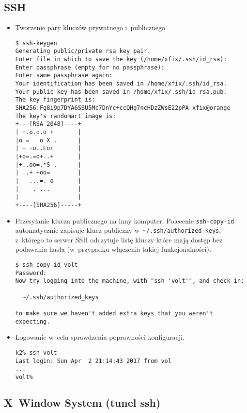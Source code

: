 \documentclass[a4paper,11pt]{article}
\begin{document}
\subsection{SSH}

\begin{itemize}

\item Tworzenie pary kluczów prywatnego i~publicznego

\begin{verbatim}
$ ssh-keygen 
Generating public/private rsa key pair.
Enter file in which to save the key (/home/xfix/.ssh/id_rsa): 
Enter passphrase (empty for no passphrase): 
Enter same passphrase again: 
Your identification has been saved in /home/xfix/.ssh/id_rsa.
Your public key has been saved in /home/xfix/.ssh/id_rsa.pub.
The key fingerprint is:
SHA256:Fg8i9p7DYA6SSU5Mc7DnYc+ccQHg7ncHDzZWsE22pPA xfix@orange
The key's randomart image is:
+---[RSA 2048]----+
| +.o.o.o +       |
|o =   o X .      |
| = =o..Eo+       |
|+o=.=o+..+       |
|+..oo=.*S .      |
| ..+ +oo=        |
|   ...=. o       |
|    . ...        |
|                 |
+----[SHA256]-----+
\end{verbatim}

\item Przesyłanie klucza publicznego na inny komputer. Polecenie
\verb|ssh-copy-id| automatycznie zapisuje klucz publiczny
w~\verb|~/.ssh/authorized_keys|, z~którego to serwer SSH odczytuje
listę kluczy które mają dostęp bez podawania hasła (w~przypadku
włączenia takiej funkcjonalności).

\begin{verbatim}
$ ssh-copy-id volt
Password: 
Now try logging into the machine, with "ssh 'volt'", and check in:

  ~/.ssh/authorized_keys

to make sure we haven't added extra keys that you weren't expecting.
\end{verbatim}

\item Logowanie w~celu sprawdzenia poprawności konfiguracji.

\begin{verbatim}
k2% ssh volt
Last login: Sun Apr  2 21:14:43 2017 from vol
...
volt%
\end{verbatim}

\end{itemize}

\subsection{X~Window System (tunel ssh)}
\end{document}
